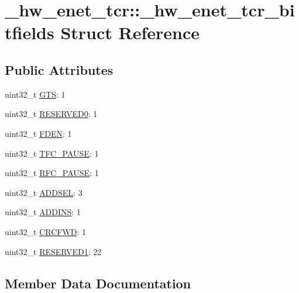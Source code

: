 \hypertarget{struct__hw__enet__tcr_1_1__hw__enet__tcr__bitfields}{}\section{\+\_\+hw\+\_\+enet\+\_\+tcr\+:\+:\+\_\+hw\+\_\+enet\+\_\+tcr\+\_\+bitfields Struct Reference}
\label{struct__hw__enet__tcr_1_1__hw__enet__tcr__bitfields}
\subsection*{Public Attributes}
\begin{DoxyCompactItemize}
\item 
uint32\+\_\+t \hyperlink{struct__hw__enet__tcr_1_1__hw__enet__tcr__bitfields_a8c975a1316d1c2590dda8c690c6575b1}{G\+TS}\+: 1
\item 
uint32\+\_\+t \hyperlink{struct__hw__enet__tcr_1_1__hw__enet__tcr__bitfields_aef41bd81cd1c52dbc6e77004c48b410c}{R\+E\+S\+E\+R\+V\+E\+D0}\+: 1
\item 
uint32\+\_\+t \hyperlink{struct__hw__enet__tcr_1_1__hw__enet__tcr__bitfields_aa840b5243c62bd6bef5364c50b1a5c56}{F\+D\+EN}\+: 1
\item 
uint32\+\_\+t \hyperlink{struct__hw__enet__tcr_1_1__hw__enet__tcr__bitfields_a2cb2f3a8046da6cf9576ac6f4bf289d6}{T\+F\+C\+\_\+\+P\+A\+U\+SE}\+: 1
\item 
uint32\+\_\+t \hyperlink{struct__hw__enet__tcr_1_1__hw__enet__tcr__bitfields_a1041fe8182e7450b9179fe243c465f6a}{R\+F\+C\+\_\+\+P\+A\+U\+SE}\+: 1
\item 
uint32\+\_\+t \hyperlink{struct__hw__enet__tcr_1_1__hw__enet__tcr__bitfields_a24a04d00f19a15bf8e867627a8a97fb6}{A\+D\+D\+S\+EL}\+: 3
\item 
uint32\+\_\+t \hyperlink{struct__hw__enet__tcr_1_1__hw__enet__tcr__bitfields_a3ae10384b91a6cc02dba5de4afed0437}{A\+D\+D\+I\+NS}\+: 1
\item 
uint32\+\_\+t \hyperlink{struct__hw__enet__tcr_1_1__hw__enet__tcr__bitfields_af51d89ae77eaf1e175b84a62f8a42dd1}{C\+R\+C\+F\+WD}\+: 1
\item 
uint32\+\_\+t \hyperlink{struct__hw__enet__tcr_1_1__hw__enet__tcr__bitfields_a2d6929686262c5edafbb2949026da39d}{R\+E\+S\+E\+R\+V\+E\+D1}\+: 22
\end{DoxyCompactItemize}


\subsection{Member Data Documentation}
